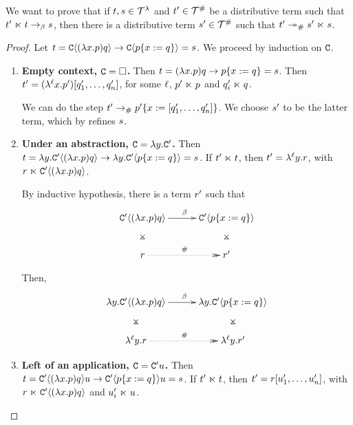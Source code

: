 We want to prove that if $t,s \in \mathcal{T}^{\lambda}$ and
$t' \in \mathcal{T}^{\mathtt{\#}}$ be a distributive term
such that $t' \mathrel{\ltimes} t \mathrel{\to_\beta} s$,
then there is a distributive term $s' \in \mathcal{T}^{\mathtt{\#}}$
such that $t' \mathrel{\twoheadrightarrow_{\mathtt{\#}}} s' \mathrel{\ltimes} s$.

\begin{proof}
Let $t = \mathtt{C}\langle(\lambda x. p) q\rangle \to \mathtt{C}\langle p\{x := q\}\rangle = s$.
We proceed by induction on $\mathtt{C}$.
\begin{enumerate}
\item {\bf Empty context, $\mathtt{C} = \Box$.}
Then $t = (\lambda x. p) q \to {p\{x:= q\}} = s$.
Then $t' = (\lambda^{\ell} x. p') [q_1', \hdots, q_n']$, for some
  $\ell$, $p' \mathrel{\ltimes} p$ and $q_i' \mathrel{\ltimes} q$.

We can do the step $t' \mathrel{\to_{\mathtt{\#}}} p'\{x := [q_1', \hdots, q_n']\}$.
We choose $s'$ to be the latter term, which by  refines $s$.
\item {\bf Under an abstraction, $\mathtt{C} = \lambda y. \mathtt{C}'$.}
Then $t = \lambda y. \mathtt{C}'\langle(\lambda x. p) q\rangle
        \to \lambda y. \mathtt{C}'\langle p\{x := q\}\rangle = s$.
If $t' \mathrel{\ltimes} t$, then $t' = \lambda^{\ell} y. r$,
  with $r \mathrel{\ltimes} \mathtt{C}'\langle(\lambda x. p) q\rangle$.

By inductive hypothesis, there is a term $r'$ such that
\[
\xymatrix@C=1cm{
 \contwoof{(\lam{\var}{\tmfive}) \tmsix} \ar@{}[d]|*=0[@]{\rtimes} \ar[r]^{\beta}
    & \contwoof{\subs{\tmfive}{\var}{\tmsix}} \ar@{}[d]|*=0[@]{\rtimes} \\
 \tmfour \ar@{.>>}[r]^{\dist} & \tmfour' \\
}
\]

Then,
\[
\xymatrix@C=1cm{
 \lam{\vartwo}{\contwoof{(\lam{\var}{\tmfive}) \tmsix}} \ar@{}[d]|*=0[@]{\rtimes} \ar[r]^{\beta}
    & \lam{\vartwo}{\contwoof{\subs{\tmfive}{\var}{\tmsix}}} \ar@{}[d]|*=0[@]{\rtimes} \\
 \lamp{\lab}{\vartwo}{\tmfour} \ar@{.>>}[r]^{\dist} & \lamp{\lab}{\vartwo}{\tmfour'} \\
}
\]

\item {\bf Left of an application, $\mathtt{C} = \mathtt{C}' u$.}
Then $t = \mathtt{C}'\langle(\lambda x. p) q\rangle u
        \to \mathtt{C}'\langle p\{x := q\}\rangle u = s$.
If $t' \mathrel{\ltimes} t$, then $t' = r [u'_1, \hdots, u'_n]$,
  with $r \mathrel{\ltimes} \mathtt{C}'\langle(\lambda x. p) q\rangle$
  and $u'_i \mathrel{\ltimes} u$.


\end{enumerate}
\end{proof}
